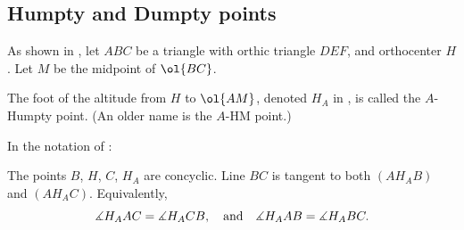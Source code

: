 \documentclass[11pt]{scrartcl}
\begin{document}
\subsection{Humpty and Dumpty points}
As shown in , let $ABC$ be a triangle with orthic triangle $DEF$,
and orthocenter $H$. Let $M$ be the midpoint of $\ol{BC}$.
\begin{definition}
  The foot of the altitude from $H$ to $\ol{AM}$,
  denoted $H_A$ in ,
  is called the \alert{$A$-Humpty point}.
  (An older name is the $A$-HM point.)
\end{definition}
\begin{theorem}
  \label{thm:humpty}
  In the notation of :
  \begin{enumerate}
    \ii The points $B$, $H$, $C$, $H_A$ are concyclic.
    \ii Line $BC$ is tangent to both $(AH_AB)$ and $(AH_AC)$.
    Equivalently,
    \begin{equation}
      \measuredangle H_AAC = \measuredangle H_ACB, \quad\text{and}\quad \measuredangle H_AAB = \measuredangle H_ABC.
      \label{eq:humpty_angle}
    \end{equation}
  \end{enumerate}
\end{theorem}
\end{document}
